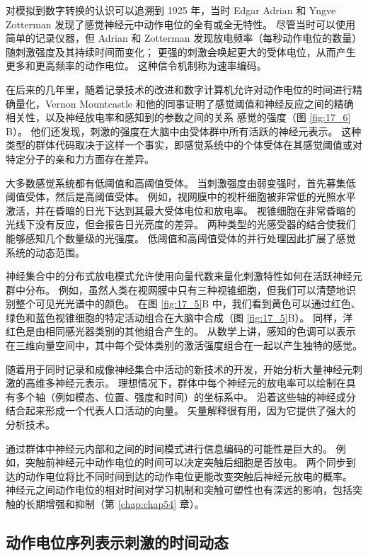 对模拟到数字转换的认识可以追溯到 1925 年，当时 Edgar Adrian 和 Yngve Zotterman 发现了感觉神经元中动作电位的全有或全无特性。 
尽管当时可以使用简单的记录仪器，但 Adrian 和 Zotterman 发现放电频率（每秒动作电位的数量）随刺激强度及其持续时间而变化； 
更强的刺激会唤起更大的受体电位，从而产生更多和更高频率的动作电位。 
这种信令机制称为速率编码。


在后来的几年里，随着记录技术的改进和数字计算机允许对动作电位的时间进行精确量化，Vernon Mountcastle 和他的同事证明了感觉阈值和神经反应之间的精确相关性，以及神经放电率和感知到的参数之间的关系 感觉的强度（图 \ref{fig:17_6} B）。 
他们还发现，刺激的强度在大脑中由受体群中所有活跃的神经元表示。 
这种类型的群体代码取决于这样一个事实，即感觉系统中的个体受体在其感觉阈值或对特定分子的亲和力方面存在差异。


大多数感觉系统都有低阈值和高阈值受体。 
当刺激强度由弱变强时，首先募集低阈值受体，然后是高阈值受体。 
例如，视网膜中的视杆细胞被非常低的光照水平激活，并在昏暗的日光下达到其最大受体电位和放电率。 
视锥细胞在非常昏暗的光线下没有反应，但会报告日光亮度的差异。 
两种类型的光感受器的结合使我们能够感知几个数量级的光强度。 
低阈值和高阈值受体的并行处理因此扩展了感觉系统的动态范围。


神经集合中的分布式放电模式允许使用向量代数来量化刺激特性如何在活跃神经元群中分布。 
例如，虽然人类在视网膜中只有三种视锥细胞，但我们可以清楚地识别整个可见光光谱中的颜色。 
在图 \ref{fig:17_5}B 中，我们看到黄色可以通过红色、绿色和蓝色视锥细胞的特定活动组合在大脑中合成（图 \ref{fig:17_5}B）。 
同样，洋红色是由相同感光器类别的其他组合产生的。 
从数学上讲，感知的色调可以表示在三维向量空间中，其中每个受体类别的激活强度组合在一起以产生独特的感觉。


随着用于同时记录和成像神经集合中活动的新技术的开发，开始分析大量神经元刺激的高维多神经元表示。 
理想情况下，群体中每个神经元的放电率可以绘制在具有多个轴（例如模态、位置、强度和时间）的坐标系中。 
沿着这些轴的神经成分结合起来形成一个代表人口活动的向量。 
矢量解释很有用，因为它提供了强大的分析技术。


通过群体中神经元内部和之间的时间模式进行信息编码的可能性是巨大的。 
例如，突触前神经元中动作电位的时间可以决定突触后细胞是否放电。 
两个同步到达的动作电位将比不同时间到达的动作电位更能改变突触后神经元放电的概率。 
神经元之间动作电位的相对时间对学习机制和突触可塑性也有深远的影响，包括突触的长期增强和抑制（第 \ref{chap:chap54} 章）。


\subsection{动作电位序列表示刺激的时间动态}


